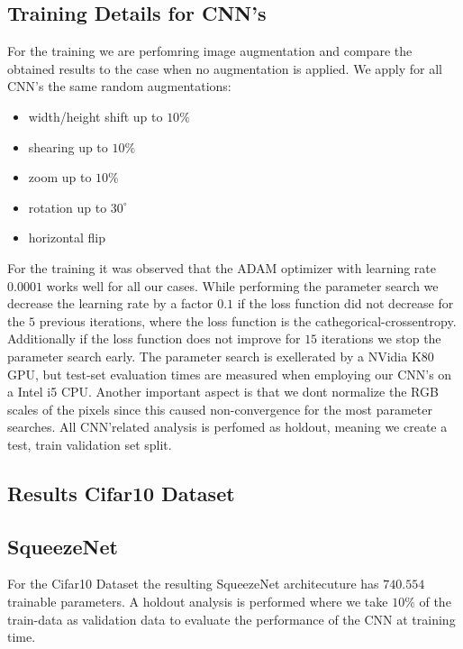 \documentclass[11pt]{article}
\begin{document}
\subsection{Training Details for CNN's}
For the training we are perfomring image augmentation and compare the obtained results to the case when no augmentation is applied. We apply for all CNN's the same random augmentations:
%
\begin{itemize}
	\item width/height shift up to $10\%$
	\item shearing up to $10\%$
	\item zoom up to $10\%$
	\item rotation up to $30^\circ$
	\item horizontal flip
\end{itemize}
%
For the training it was observed that the ADAM optimizer with learning rate $0.0001$ works well for all our cases. While performing the parameter search we decrease the learning rate by a factor $0.1$ if the loss function did not decrease for the $5$ previous iterations, where the loss function is the cathegorical-crossentropy. Additionally if the loss function does not improve for $15$ iterations we stop the parameter search early. The parameter search is exellerated by a NVidia K80 GPU, but test-set evaluation times are measured when employing our CNN's on a Intel i5 CPU. Another important aspect is that we dont normalize the RGB scales of the pixels since this caused non-convergence for the most parameter searches. All CNN'related analysis is perfomed as holdout, meaning we create a test, train validation set split.



\subsection{Results Cifar10 Dataset}

\subsection{SqueezeNet}
For the Cifar10 Dataset the resulting SqueezeNet architecuture has $740.554$ trainable parameters. 
A holdout analysis is performed where we take $10\%$ of the train-data as validation data to evaluate the performance of the CNN at training time. 
\end{document}
